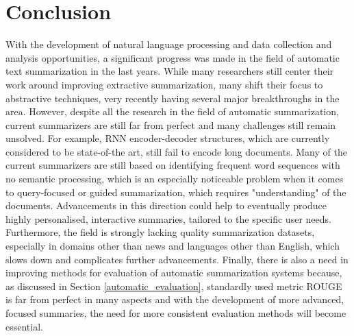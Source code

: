 \documentclass[11pt,a4paper,onecolumn]{article}
\begin{document}
\section{Conclusion}
With the development of natural language processing and data collection and analysis opportunities, a significant progress was made in the field of automatic text summarization in the last years.
While many researchers still center their work around improving extractive summarization, many shift their focus to abstractive techniques, very recently having several major breakthroughs in the area.
However, despite all the research in the field of automatic summarization, current summarizers are still far from perfect and many challenges still remain unsolved. For example, RNN encoder-decoder structures, which are currently considered to be state-of-the art, still fail to encode long documents.
Many of the current summarizers are still based on identifying frequent word sequences with no semantic processing, which is an especially noticeable problem when it comes to query-focused or guided summarization, which requires "understanding" of the documents.
Advancements in this direction could help to eventually  produce highly personalised, interactive summaries, tailored to the specific user needs.
Furthermore, the field is strongly lacking quality summarization datasets, especially in domains other than news and languages other than English, which slows down and complicates further advancements.
Finally, there is also a need in improving methods for evaluation of automatic summarization  systems because, as discussed in Section \ref{automatic_evaluation},  standardly used metric ROUGE is far from perfect in many aspects and with the development of more advanced, focused summaries, the need for more consistent evaluation methods will become essential.

%
%



\appendix
\end{document}
